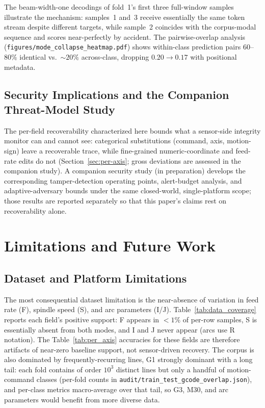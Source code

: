 \documentclass[sensors,article,submit,moreauthors,pdftex]{Definitions/mdpi}
\begin{document}
The beam-width-one decodings of fold~1's first three full-window samples illustrate the mechanism: samples~1 and~3 receive essentially the same token stream despite different targets, while sample~2 coincides with the corpus-modal sequence and scores near-perfectly by accident. The pairwise-overlap analysis (\texttt{figures/mode\_collapse\_heatmap.pdf}) shows within-class prediction pairs $60$--$80\%$ identical vs.\ $\sim\!20\%$ across-class, dropping $0.20\!\to\!0.17$ with positional metadata.

\subsection{Security Implications and the Companion Threat-Model Study}
\label{sec:disc-threat-model}

The per-field recoverability characterized here bounds what a sensor-side integrity monitor can and cannot see: categorical substitutions (command, axis, motion-sign) leave a recoverable trace, while fine-grained numeric-coordinate and feed-rate edits do not (Section~\ref{sec:per-axis}; gross deviations are assessed in the companion study). A companion security study (in preparation) develops the corresponding tamper-detection operating points, alert-budget analysis, and adaptive-adversary bounds under the same closed-world, single-platform scope; those results are reported separately so that this paper's claims rest on recoverability alone.

\section{Limitations and Future Work}
\label{sec:future}

\subsection{Dataset and Platform Limitations}
\label{sec:lim-dataset}

The most consequential dataset limitation is the near-absence of variation in feed rate (F), spindle speed (S), and arc parameters (I/J). Table~\ref{tab:data_coverage} reports each field's positive support: F appears in $<\!1\%$ of per-row samples, S is essentially absent from both modes, and I and J never appear (arcs use R notation). The Table~\ref{tab:per_axis} accuracies for these fields are therefore artifacts of near-zero baseline support, not sensor-driven recovery. The corpus is also dominated by frequently-recurring lines, G1 strongly dominant with a long tail: each fold contains of order $10^3$ distinct lines but only a handful of motion-command classes (per-fold counts in \texttt{audit/train\_test\_gcode\_overlap.json}), and per-class metrics macro-average over that tail, so G3, M30, and arc parameters would benefit from more diverse data.
\end{document}
